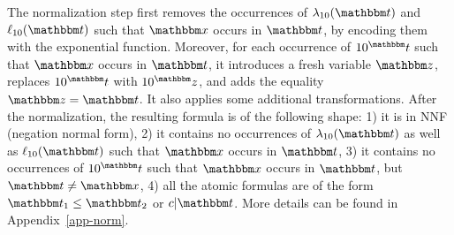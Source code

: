 The normalization step first removes the occurrences of $\lambda_{10}(\iterm)$ and $\ell_{10}(\iterm)$  such that $\ivarx$ occurs  in $\iterm$, by encoding them with the exponential function. Moreover, for each occurrence of $10^\iterm$ such that $\ivarx$ occurs in $\iterm$, it introduces a fresh variable $\ivarz$, replaces $10^\iterm$ with $10^\ivarz$, and adds the equality $\ivarz = \iterm$.  It also applies some additional transformations. After the normalization, the resulting formula is of the following shape: 1) it is in NNF (negation normal form),  2) it contains no occurrences of $\lambda_{10}(\iterm)$ as well as $\ell_{10}(\iterm)$ such that $\ivarx$ occurs in $\iterm$, 3)  it contains no occurrences of $10^\iterm$ such that $\ivarx$ occurs in $\iterm$, but $\iterm \neq \ivarx$, 4) all the atomic formulas are of the form $\iterm_1 \le \iterm_2$ or $c | \iterm$. More details can be found in Appendix~\ref{app-norm}.


